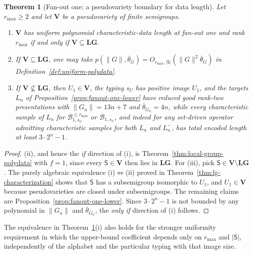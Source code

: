 \documentclass[11pt]{article}
\numberwithin{equation}{section}
\theoremstyle{plain}
\newtheorem{theorem}{Theorem}[section]
\theoremstyle{definition}
\theoremstyle{remark}
\theoremstyle{plain}
\begin{document}
\begin{theorem}[Fan-out one: a pseudovariety boundary for data length]
\label{thm:fanout-one-data}
Let $r_{\max}\ge2$ and let $\mathbf V$ be a pseudovariety of finite
semigroups.
\begin{enumerate}[label=\textup{(\roman*)},leftmargin=*]
\item $\mathbf V$ has uniform polynomial characteristic-data length at
fan-out one and rank $r_{\max}$ if and only if
$\mathbf V\subseteq\mathbf{LG}$.
\item If $\mathbf V\subseteq\mathbf{LG}$, one may take
$p(\|G\|,\bar\theta_G)=O_{r_{\max},|\mathsf S|}(\|G\|^2\bar\theta_G)$ in
Definition~\ref{def:uniform-polydata}.
\item If $\mathbf V\not\subseteq\mathbf{LG}$, then $U_1\in\mathbf V$, the
typing $s_U$ has positive image $U_1$, and the targets $L_n$ of
Proposition~\ref{prop:fanout-one-lower} have reduced good rank-two
presentations with $\|G_n\|=13n+7$ and $\bar\theta_{G_n}=4n$, while every characteristic sample of $L_n$ for
$\mathcal B^{\le r_{\max}}_{1,s_U}$ or $\mathcal B_{1,s_U}$,
and indeed for any set-driven operator admitting characteristic samples
for both $L_n$ and $L_n^-$, has total encoded length at least
$3\cdot2^n-1$.
\end{enumerate}
\end{theorem}

\begin{proof}
(ii), and hence the \emph{if} direction of (i), is
Theorem~\ref{thm:local-group-polydata} with $f=1$, since every
$\mathsf S\in\mathbf V$ then lies in $\mathbf{LG}$.  For (iii), pick
$\mathsf S\in\mathbf V\setminus\mathbf{LG}$.  The purely algebraic equivalence (i)$\Leftrightarrow$(ii) proved
in Theorem~\ref{thm:lg-characterization} shows that $\mathsf S$ has a
subsemigroup isomorphic to $U_1$, and $U_1\in\mathbf V$ because
pseudovarieties are closed under subsemigroups.  The remaining claims are
Proposition~\ref{prop:fanout-one-lower}.  Since $3\cdot2^n-1$ is not
bounded by any polynomial in $\|G_n\|$ and $\bar\theta_{G_n}$, the
\emph{only if} direction of (i) follows.
\end{proof}

The equivalence in Theorem~\ref{thm:fanout-one-data}(i) also holds
for the stronger uniformity requirement in which the upper-bound
coefficient depends only on $r_{\max}$ and $|\mathsf S|$, independently
of the alphabet and the particular typing with that image size.
\end{document}
